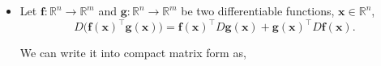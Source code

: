 \documentclass[12pt,thmsa]{article}
\begin{document}
\begin{itemize}
	\item Let \(\boldsymbol{f}: \mathbb{R}^{n} \rightarrow \mathbb{R}^{m}\) and \(\boldsymbol{g}: \mathbb{R}^{n} \rightarrow \mathbb{R}^{m}\) be two differentiable functions, \(\boldsymbol{x} \in \mathbb{R}^{n}\),
	\[ D \bigg (\boldsymbol{f}(\boldsymbol{x})^{\top} \boldsymbol{g}(\boldsymbol{x}) \bigg )
	=\boldsymbol{f}(\boldsymbol{x})^{\top} D \boldsymbol{g}(\boldsymbol{x})+\boldsymbol{g}(\boldsymbol{x})^{\top} D \boldsymbol{f}(\boldsymbol{x}). \]
	
	We can write it into compact matrix form as,


\end{itemize}
\end{document}
